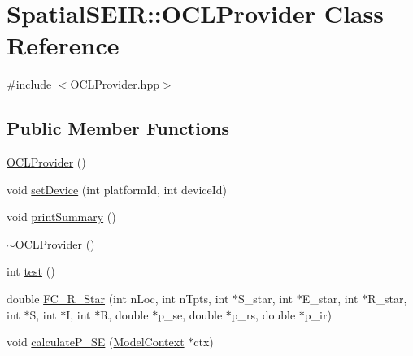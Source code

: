 \hypertarget{classSpatialSEIR_1_1OCLProvider}{\section{Spatial\-S\-E\-I\-R\-:\-:O\-C\-L\-Provider Class Reference}
\label{classSpatialSEIR_1_1OCLProvider}
}


{\ttfamily \#include $<$O\-C\-L\-Provider.\-hpp$>$}

\subsection*{Public Member Functions}
\begin{DoxyCompactItemize}
\item 
\hyperlink{classSpatialSEIR_1_1OCLProvider_a09cfbb1c69ee8427af6f20c94b4939e3}{O\-C\-L\-Provider} ()
\item 
void \hyperlink{classSpatialSEIR_1_1OCLProvider_a8b26bae3d6185e4f58c2e935adcc1d1b}{set\-Device} (int platform\-Id, int device\-Id)
\item 
void \hyperlink{classSpatialSEIR_1_1OCLProvider_addd977b34b4a4e7cb13284d039d1eae7}{print\-Summary} ()
\item 
\hyperlink{classSpatialSEIR_1_1OCLProvider_afad1c27635c6294219627bdbbfa668dd}{$\sim$\-O\-C\-L\-Provider} ()
\item 
int \hyperlink{classSpatialSEIR_1_1OCLProvider_a681ec4289165a8206ad3c869367ea94b}{test} ()
\item 
double \hyperlink{classSpatialSEIR_1_1OCLProvider_a6b1fae533ef49addc8c3eb98d85653e2}{F\-C\-\_\-\-R\-\_\-\-Star} (int n\-Loc, int n\-Tpts, int $\ast$S\-\_\-star, int $\ast$E\-\_\-star, int $\ast$R\-\_\-star, int $\ast$S, int $\ast$I, int $\ast$R, double $\ast$p\-\_\-se, double $\ast$p\-\_\-rs, double $\ast$p\-\_\-ir)
\item 
void \hyperlink{classSpatialSEIR_1_1OCLProvider_a3a1c037a75707383d5935d8b96d818e4}{calculate\-P\-\_\-\-S\-E} (\hyperlink{classSpatialSEIR_1_1ModelContext}{Model\-Context} $\ast$ctx)
\end{DoxyCompactItemize}



